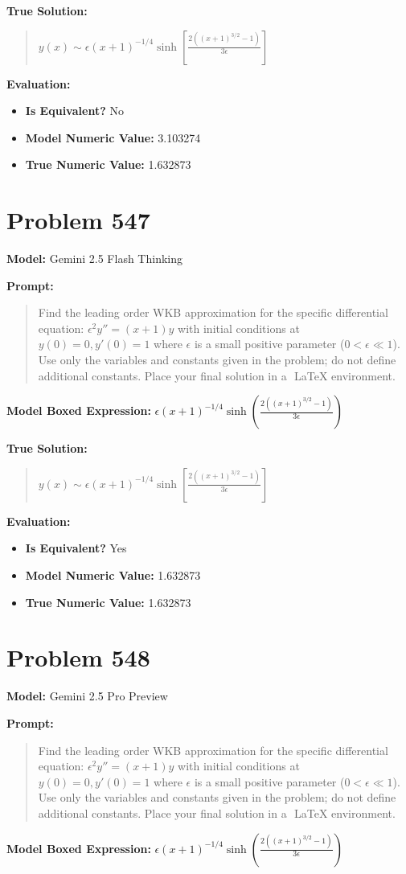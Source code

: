 \documentclass{article}
\begin{document}
\textbf{True Solution:}
\begin{quote}
$y(x) \sim \epsilon (x+1)^{-1/4}\sinh\left[\frac{2\left((x+1)^{3/2}-1\right)}{3\epsilon}\right]$
\end{quote}

\textbf{Evaluation:}
\begin{itemize}
\item \textbf{Is Equivalent?} No
\item \textbf{Model Numeric Value:} 3.103274
\item \textbf{True Numeric Value:} 1.632873
\end{itemize}
\vspace{1cm}
\section*{Problem 547}
\textbf{Model:} Gemini 2.5 Flash Thinking

\textbf{Prompt:}
\begin{quote}
Find the leading order WKB approximation for the specific differential equation: $\epsilon^2 y'' = (x+1)y$ with initial conditions at $y(0)=0, y'(0)=1$ where $\epsilon$ is a small positive parameter ($0 < \epsilon \ll 1$). Use only the variables and constants given in the problem; do not define additional constants. Place your final solution in a $\boxed{}$ LaTeX environment.
\end{quote}
\textbf{Model Boxed Expression:} $\epsilon (x+1)^{-1/4} \sinh\left(\frac{2\left((x+1)^{3/2}-1\right)}{3\epsilon}\right)$

\textbf{True Solution:}
\begin{quote}
$y(x) \sim \epsilon (x+1)^{-1/4}\sinh\left[\frac{2\left((x+1)^{3/2}-1\right)}{3\epsilon}\right]$
\end{quote}

\textbf{Evaluation:}
\begin{itemize}
\item \textbf{Is Equivalent?} Yes
\item \textbf{Model Numeric Value:} 1.632873
\item \textbf{True Numeric Value:} 1.632873
\end{itemize}
\vspace{1cm}
\section*{Problem 548}
\textbf{Model:} Gemini 2.5 Pro Preview

\textbf{Prompt:}
\begin{quote}
Find the leading order WKB approximation for the specific differential equation: $\epsilon^2 y'' = (x+1)y$ with initial conditions at $y(0)=0, y'(0)=1$ where $\epsilon$ is a small positive parameter ($0 < \epsilon \ll 1$). Use only the variables and constants given in the problem; do not define additional constants. Place your final solution in a $\boxed{}$ LaTeX environment.
\end{quote}
\textbf{Model Boxed Expression:} $\epsilon (x+1)^{-1/4} \sinh\left(\frac{2((x+1)^{3/2}-1)}{3\epsilon}\right)$
\end{document}
